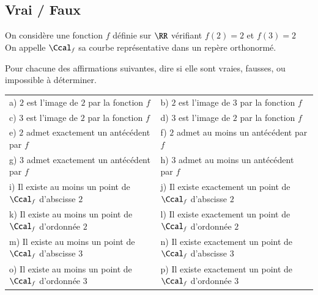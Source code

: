 \documentclass[oneside,12pt]{article}          			%
\begin{document}
\subsection{Vrai / Faux}
On considère une fonction $f$ définie sur $\RR$ vérifiant $f(2)=2$ et $f(3)=2$ \\
On appelle $\Ccal_f$ sa courbe représentative dans un repère orthonormé.

Pour chacune des affirmations suivantes, dire si elle sont vraies, fausses, ou impossible à déterminer.


\renewcommand{\arraystretch}{1.5} 
\begin{tabular}{ll}
	a) $2$ est l'image de $2$ par la fonction $f$ &
	b) $2$ est l'image de $3$ par la fonction $f$ \\
	c) $3$ est l'image de $2$ par la fonction $f$ &
	d) $3$ est l'image de $2$ par la fonction $f$ \\
	e) $2$ admet exactement un antécédent par $f$ &
	f) $2$ admet au moins un antécédent par $f$ \\
	g) $3$ admet exactement un antécédent par $f$ &
	h) $3$ admet au moins un antécédent par $f$ \\
	i) Il existe au moins un point de $\Ccal_f$ d'abscisse $2$ &
	j) Il existe exactement un point de $\Ccal_f$ d'abscisse $2$ \\
	k) Il existe au moins un point de $\Ccal_f$ d'ordonnée $2$ &
	l) Il existe exactement un point de $\Ccal_f$ d'ordonnée $2$ \\
	m) Il existe au moins un point de $\Ccal_f$ d'abscisse $3$ &
	n) Il existe exactement un point de $\Ccal_f$ d'abscisse $3$ \\
	o) Il existe au moins un point de $\Ccal_f$ d'ordonnée $3$ &
	p) Il existe exactement un point de $\Ccal_f$ d'ordonnée $3$
\end{tabular}
\end{document}
